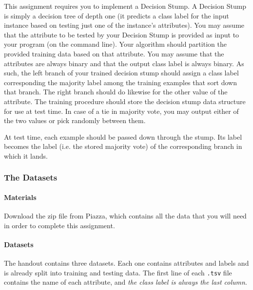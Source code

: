 \documentclass[11pt,addpoints,answers]{exam}
\numberwithin{equation}{section} %
\numberwithin{figure}{section} %
\numberwithin{table}{section} %
\begin{document}
This assignment requires you to implement a Decision Stump.  A Decision Stump is simply a decision tree of depth one (it predicts a class label for the input instance based on testing just one of the instance's attributes). You may assume that the attribute to be tested by your Decision Stump is provided as input to your program (on the command line). Your algorithm should partition the provided training data based on that attribute. You may assume that the attributes are always binary and that the output class label is always binary. As such, the left branch of your trained decision stump should assign a class label corresponding the majority label among the training examples that sort down that branch. The right branch should do likewise for the other value of the attribute. The training procedure should store the decision stump data structure for use at test time. In case of a tie in majority vote, you may output either of the two values or pick randomly between them.

At test time, each example should be passed down through the stump. Its label becomes the label (i.e. the stored majority vote) of the corresponding branch in which it lands. 

\subsubsection{The Datasets}
\label{sec:data}

\paragraph{Materials} Download the zip file from Piazza, which contains all the data that you will need in order to complete this assignment.

\paragraph{Datasets}

The handout contains three datasets. Each one contains attributes and labels and is already split into training and testing data. The first line of each \lstinline{.tsv} file contains the name of each attribute, and \emph{the class label is always the last column}.
\end{document}
